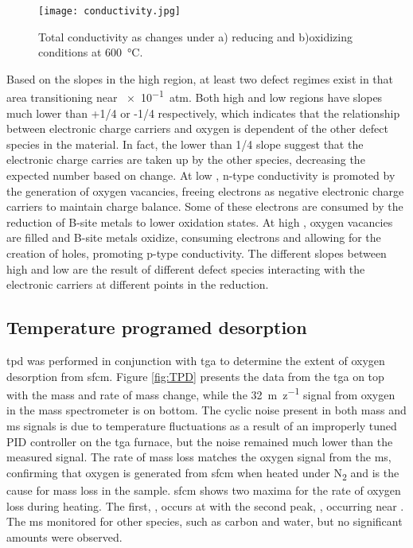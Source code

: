     \begin{figure}
      \texttt{[image: conductivity.jpg]}
      \caption{Total conductivity as  changes under a) reducing and b)oxidizing conditions at \SI{600}{\celsius}.}
      \label{fig:conductivity}
    \end{figure}

    Based on the slopes in the high  region, at least two defect regimes exist in that area transitioning near \SI{e-1}{atm}.
    Both high and low  regions have slopes much lower than +1/4 or -1/4 respectively, which indicates that the relationship between electronic charge carriers and oxygen is dependent of the other defect species in the material.
    In fact, the lower than 1/4 slope suggest that the electronic charge carries are taken up by the other species, decreasing the expected number based on  change.
    At low , n-type conductivity is promoted by the generation of oxygen vacancies, freeing electrons as negative electronic charge carriers to maintain charge balance.
    Some of these electrons are consumed by the reduction of B-site metals to lower oxidation states.
    At high , oxygen vacancies are filled and B-site metals oxidize, consuming electrons and allowing for the creation of holes, promoting p-type conductivity.
    The different slopes between high and low  are the result of different defect species interacting with the electronic carriers at different points in the reduction.

    \subsection{Temperature programed desorption}
    \Gls{tpd} was performed in conjunction with \gls{tga} to determine the extent of oxygen desorption from \gls{sfcm}.
    Figure \ref{fig:TPD} presents the data from the \gls{tga} on top with the mass and rate of mass change, while the \SI{32}{m\per z} signal from oxygen in the mass spectrometer is on bottom.
    The cyclic noise present in both mass and \gls{ms} signals is due to temperature fluctuations as a result of an improperly tuned PID controller on the \gls{tga} furnace, but the noise remained much lower than the measured signal.
    The rate of mass loss matches the oxygen signal from the \gls{ms}, confirming that oxygen is generated from \gls{sfcm} when heated under N\textsubscript{2} and is the cause for mass loss in the sample.
    \gls{sfcm} shows two maxima for the rate of oxygen loss during heating.
    The first, \textalpha, occurs at  with the second peak, \textbeta, occurring near .
    The \gls{ms} monitored for other species, such as carbon and water, but no significant amounts were observed.

